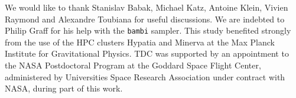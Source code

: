 \documentclass[aps,showpacs,twocolumn,prd,superscriptaddress,nofootinbib]{revtex4-1}
\begin{document}

%
%
%


\begin{acknowledgments}

We would like to thank Stanislav Babak, Michael Katz, Antoine Klein, Vivien Raymond and Alexandre Toubiana for useful discussions.
We are indebted to Philip Graff for his help with the \texttt{bambi} sampler. This study benefited strongly from the use of the HPC clusters Hypatia and Minerva at the Max Planck Institute for Gravitational Physics.
TDC was supported by an appointment to the NASA Postdoctoral Program at the Goddard Space Flight Center, administered by Universities Space Research Association under contract with NASA, during part of this work.

\end{acknowledgments}


\end{document}
